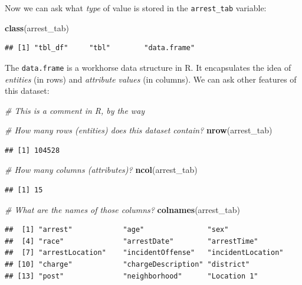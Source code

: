 \documentclass[]{article}
\newenvironment{Shaded}{\begin{snugshade}}{\end{snugshade}}
\newcommand{\KeywordTok}[1]{\textcolor[rgb]{0.13,0.29,0.53}{\textbf{{#1}}}}
\newcommand{\CommentTok}[1]{\textcolor[rgb]{0.56,0.35,0.01}{\textit{{#1}}}}
\newcommand{\NormalTok}[1]{{#1}}
\theoremstyle{definition}
\theoremstyle{definition}
\theoremstyle{remark}
\begin{document}
Now we can ask what \emph{type} of value is stored in the
\texttt{arrest\_tab} variable:

\begin{Shaded}
\begin{Highlighting}[]
\KeywordTok{class}\NormalTok{(arrest_tab)}
\end{Highlighting}
\end{Shaded}

\begin{verbatim}
## [1] "tbl_df"     "tbl"        "data.frame"
\end{verbatim}

The \texttt{data.frame} is a workhorse data structure in R. It
encapsulates the idea of \emph{entities} (in rows) and \emph{attribute
values} (in columns). We can ask other features of this dataset:

\begin{Shaded}
\begin{Highlighting}[]
\CommentTok{# This is a comment in R, by the way}

\CommentTok{# How many rows (entities) does this dataset contain?}
\KeywordTok{nrow}\NormalTok{(arrest_tab)}
\end{Highlighting}
\end{Shaded}

\begin{verbatim}
## [1] 104528
\end{verbatim}

\begin{Shaded}
\begin{Highlighting}[]
\CommentTok{# How many columns (attributes)?}
\KeywordTok{ncol}\NormalTok{(arrest_tab)}
\end{Highlighting}
\end{Shaded}

\begin{verbatim}
## [1] 15
\end{verbatim}

\begin{Shaded}
\begin{Highlighting}[]
\CommentTok{# What are the names of those columns?}
\KeywordTok{colnames}\NormalTok{(arrest_tab)}
\end{Highlighting}
\end{Shaded}

\begin{verbatim}
##  [1] "arrest"            "age"               "sex"              
##  [4] "race"              "arrestDate"        "arrestTime"       
##  [7] "arrestLocation"    "incidentOffense"   "incidentLocation" 
## [10] "charge"            "chargeDescription" "district"         
## [13] "post"              "neighborhood"      "Location 1"
\end{verbatim}
\end{document}
